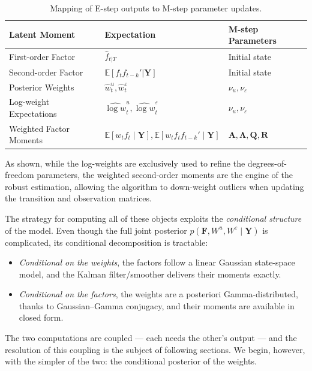 \documentclass[11pt, a4paper, oneside]{article}
\newcommand{\mY}{\mathbf{Y}}
\newcommand{\mF}{\mathbf{F}}
\newcommand{\mL}{\boldsymbol{\Lambda}}
\newcommand{\mA}{\mathbf{A}}
\newcommand{\mR}{\mathbf{R}}
\newcommand{\mQ}{\mathbf{Q}}
\begin{document}
\begin{table}[h]
\centering
\begin{tabular}{lll}
\hline
\textbf{Latent Moment} & \textbf{Expectation} & \textbf{M-step Parameters} \\ \hline
First-order Factor & $\hat{f}_{t|T}$ & Initial state \\
Second-order Factor & $\mathbb{E}[f_t f_{t-k}' | \mY]$ & Initial state \\
Posterior Weights & $\hat{w}_t^{u}, \hat{w}_t^{\varepsilon}$ & $\nu_u, \nu_\varepsilon$ \\
Log-weight Expectations & $\widehat{\log w}_t^{u}, \widehat{\log w}_t^{\varepsilon}$ & $\nu_u, \nu_\varepsilon$ \\
Weighted Factor Moments & $\mathbb{E}[w_t f_t \mid \mY], \mathbb{E}[w_t f_t f_{t-k}' \mid \mY]$ & $\mA, \mL, \mQ, \mR$ \\ \hline
\end{tabular}
\caption{Mapping of E-step outputs to M-step parameter updates.}
\label{tab:moments-mapping}
\end{table}

As shown, while the log-weights are exclusively used to refine the degrees-of-freedom parameters, the weighted second-order moments are the engine of the robust estimation, allowing the algorithm to down-weight outliers when updating the transition and observation matrices.


\bigskip

The strategy for computing all of these objects exploits the
\emph{conditional structure} of the model. Even though the full joint
posterior $p(\mF, W^u, W^\varepsilon \mid \mY)$ is complicated, its
conditional decomposition is tractable:
\begin{itemize}[leftmargin=1.5em, itemsep=3pt]
    \item \emph{Conditional on the weights}, the factors follow a
          linear Gaussian state-space model, and the Kalman
          filter/smoother delivers their moments exactly.
    \item \emph{Conditional on the factors}, the weights are
          a posteriori Gamma-distributed, thanks to Gaussian–Gamma
          conjugacy, and their moments are available in closed form.
\end{itemize}
The two computations are coupled — each needs the other's output — and
the resolution of this coupling is the subject of following sections. We begin, however, with the simpler of
the two: the conditional posterior of the weights.
\end{document}

